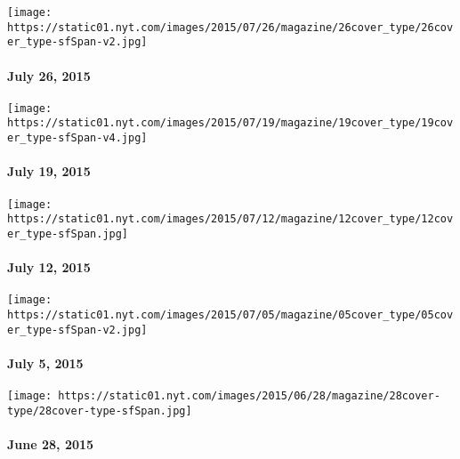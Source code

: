 \href{http://www.nytimes.com/indexes/2015/07/26/magazine/index.html}{}

\texttt{[image: https://static01.nyt.com/images/2015/07/26/magazine/26cover\_type/26cover\_type-sfSpan-v2.jpg]}

\hypertarget{july-26-2015}{%
\paragraph{July 26, 2015}\label{july-26-2015}}

\href{http://www.nytimes.com/indexes/2015/07/19/magazine/index.html}{}

\texttt{[image: https://static01.nyt.com/images/2015/07/19/magazine/19cover\_type/19cover\_type-sfSpan-v4.jpg]}

\hypertarget{july-19-2015}{%
\paragraph{July 19, 2015}\label{july-19-2015}}

\href{http://www.nytimes.com/indexes/2015/07/12/magazine/index.html}{}

\texttt{[image: https://static01.nyt.com/images/2015/07/12/magazine/12cover\_type/12cover\_type-sfSpan.jpg]}

\hypertarget{july-12-2015}{%
\paragraph{July 12, 2015}\label{july-12-2015}}

\href{http://www.nytimes.com/indexes/2015/07/05/magazine/index.html}{}

\texttt{[image: https://static01.nyt.com/images/2015/07/05/magazine/05cover\_type/05cover\_type-sfSpan-v2.jpg]}

\hypertarget{july-5-2015}{%
\paragraph{July 5, 2015}\label{july-5-2015}}

\href{http://www.nytimes.com/indexes/2015/06/28/magazine/index.html}{}

\texttt{[image: https://static01.nyt.com/images/2015/06/28/magazine/28cover-type/28cover-type-sfSpan.jpg]}

\hypertarget{june-28-2015}{%
\paragraph{June 28, 2015}\label{june-28-2015}}

